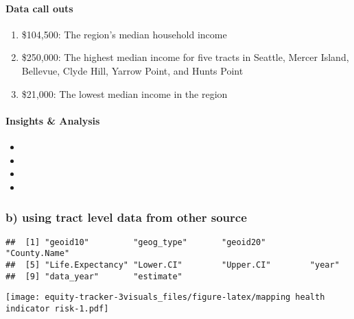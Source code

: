 \documentclass[
]{article}
\providecommand{\tightlist}{%
  \setlength{\itemsep}{0pt}\setlength{\parskip}{0pt}}
\begin{document}
\hfill\break
\hfill\break

\hypertarget{data-call-outs}{%
\paragraph{Data call outs}\label{data-call-outs}}

\begin{enumerate}
\def\labelenumi{\arabic{enumi}.}
\tightlist
\item
  \$104,500: The region's median household income
\item
  \$250,000: The highest median income for five tracts in Seattle,
  Mercer Island, Bellevue, Clyde Hill, Yarrow Point, and Hunts Point
\item
  \$21,000: The lowest median income in the region
\end{enumerate}

\hfill\break

\hypertarget{insights-analysis}{%
\paragraph{Insights \& Analysis}\label{insights-analysis}}

\begin{itemize}
\tightlist
\item
\item
\item
\item
\end{itemize}

\hfill\break
\hfill\break

\hypertarget{b-using-tract-level-data-from-other-source}{%
\subsubsection{b) using tract level data from other
source}\label{b-using-tract-level-data-from-other-source}}

\begin{verbatim}
##  [1] "geoid10"         "geog_type"       "geoid20"         "County.Name"    
##  [5] "Life.Expectancy" "Lower.CI"        "Upper.CI"        "year"           
##  [9] "data_year"       "estimate"
\end{verbatim}

\texttt{[image: equity-tracker-3visuals\_files/figure-latex/mapping health indicator risk-1.pdf]}

\hfill\break
\hfill\break
\end{document}
